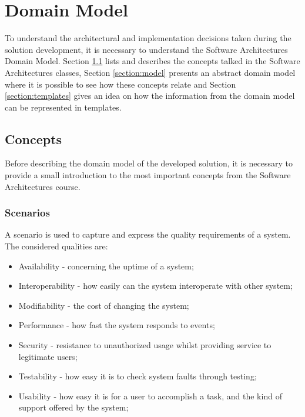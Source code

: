 \chapter{Domain Model}
\label{chapter:domainModel}
To understand the architectural and implementation decisions taken during the solution development, it is necessary to understand the Software Architectures Domain Model. Section \ref{section:SAConcepts} lists and describes the concepts talked in the Software Architectures classes, Section \ref{section:model} presents an abstract domain model where it is possible to see how these concepts relate and Section \ref{section:templates} gives an idea on how the information from the domain model can be represented in templates.

\section{Concepts}
\label{section:SAConcepts}
Before describing the domain model of the developed solution, it is necessary to provide a small introduction to the most important concepts from the Software Architectures course.
 
\subsection{Scenarios}
\label{subsection:SAConceptsScenarios}
A scenario is used to capture and express the quality requirements of a system. The considered qualities are:
\begin{itemize}
\item Availability - concerning the uptime of a system;
\item Interoperability - how easily can the system interoperate with other system;
\item Modifiability - the cost of changing the system;
\item Performance - how fast the system responds to events;
\item Security - resistance to unauthorized usage whilst providing service to legitimate users;
\item Testability - how easy it is to check system faults through testing;
\item Usability - how easy it is for a user to accomplish a task, and the kind of support offered by the system;
\end{itemize}

